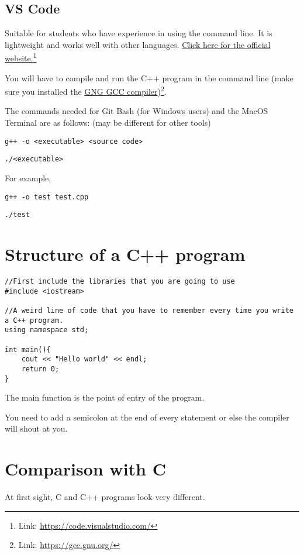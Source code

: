 \subsection*{VS Code}

Suitable for students who have experience in using the command line. It is lightweight and works well with other languages. \href{https://code.visualstudio.com/}{Click here for the official website.}\footnote{Link: \href{https://code.visualstudio.com/}{https://code.visualstudio.com/}}

You will have to compile and run the C++ program in the command line (make sure you installed the \href{https://gcc.gnu.org/}{GNG GCC compiler})\footnote{Link: \href{https://gcc.gnu.org/}{https://gcc.gnu.org/}}.

The commands needed for Git Bash (for Windows users) and the MacOS Terminal are as follows: (may be different for other tools)
\vspace{6mm}

\texttt{g++ -o <executable> <source code>}

\texttt{./<executable>}
\vspace{6mm}

For example,

\texttt{g++ -o test test.cpp}

\texttt{./test}


\section{Structure of a C++ program}
\begin{lstlisting}
//First include the libraries that you are going to use
#include <iostream> 

//A weird line of code that you have to remember every time you write a C++ program.
using namespace std;

int main(){
    cout << "Hello world" << endl;
    return 0;
}
\end{lstlisting}

The main function is the point of entry of the program.

You need to add a semicolon at the end of every statement or else the compiler will shout at you. 

\section{Comparison with C}

At first sight, C and C++ programs look very different.


